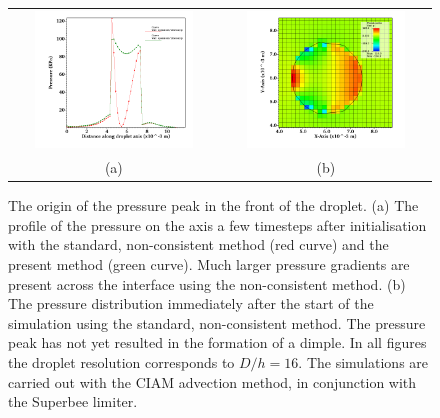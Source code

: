 \begin{figure}
\begin{center}
\begin{tabular}{cc}
\hspace*{-1.0cm}
\includegraphics[width=0.8\textwidth]{plots/raindrop/pressure_compare.png} &
\hspace{-0.4cm}%
\includegraphics[width=0.8\textwidth]{plots/raindrop/nonmc_16ppd_pressure.png}\\
\hspace{-0.8cm}%
(a) & (b)
\end{tabular}
\end{center}
\caption{The origin of the pressure peak in the front of the droplet. 
(a) The profile of the pressure on the axis a few timesteps after initialisation 
with the standard, non-consistent method (red curve) and the present method (green curve). 
Much larger pressure gradients are present across the interface using the non-consistent method. 
(b) The pressure distribution immediately after the start of the simulation 
using the standard, non-consistent method. The pressure peak has not yet resulted
in the formation of a dimple. In all figures the droplet resolution corresponds to $D/h = 16$.
The simulations are carried out with the CIAM advection method, in conjunction with the Superbee limiter.}
\label{pressure_1}
\end{figure}

